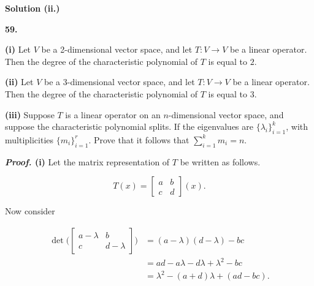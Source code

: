 \documentclass[12pt, a4paper]{article}
\begin{document}
\vspace{4mm}

\textbf{Solution (ii.)}

\vspace{6mm}

\noindent\textbf{59.}

\begin{description}
    \item\textbf{(i)  } Let $V$ be a 2-dimensional vector space, and let $T\colon V\rightarrow V$ be a linear operator. Then the degree of the characteristic polynomial of $T$ is equal to $2$.
    \item\textbf{(ii) } Let $V$ be a 3-dimensional vector space, and let $T\colon V\rightarrow V$ be a linear operator. Then the degree of the characteristic polynomial of $T$ is equal to $3$.
    \item\textbf{(iii)} Suppose $T$ is a linear operator on an $n$-dimensional vector space, and suppose the characteristic polynomial splits. If the eigenvalues are $\{\lambda_i\}_{i=1}^k$, with multiplicities $\{m_i\}_{i=1}^r$. Prove that it follows that $\sum_{i=1}^k m_i=n$.
\end{description}

\vspace{4mm}

\textbf{\textit{Proof.} (i)} Let the matrix representation of $T$ be written as follows.

\begin{equation*}
    T(x) =
    \begin{bmatrix}
       a & b \\
       c & d
    \end{bmatrix}
    (x).
\end{equation*}

\newpage

\noindent Now consider

\begin{equation*}
    \begin{split}
        \det\Bigg(
        \begin{bmatrix}
            a-\lambda & b \\
            c & d-\lambda
        \end{bmatrix}\Bigg) &= (a-\lambda)(d-\lambda)-bc \\
        &= ad-a\lambda-d\lambda+\lambda^2-bc \\
        &= \lambda^2-(a+d)\lambda+(ad-bc).
    \end{split}
\end{equation*}
\end{document}
